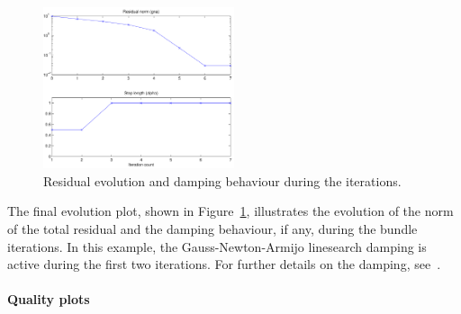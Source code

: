 \documentclass{article}
\begin{document}
\begin{figure}
  \centering
  \includegraphics[width=0.5\textwidth]{ill/ccamgnatrace}
  \caption{Residual evolution and damping behaviour during the
    iterations.}
  \label{fig:gnatrace}
\end{figure}

The final evolution plot, shown in Figure~\ref{fig:gnatrace},
illustrates the evolution of the norm of the total residual and the
damping behaviour, if any, during the bundle iterations. In this
example, the Gauss-Newton-Armijo linesearch damping is active during
the first two iterations. For further details on the damping,
see~\citet{Borlin2013:Bundle}.

\paragraph{Quality plots}
\end{document}
